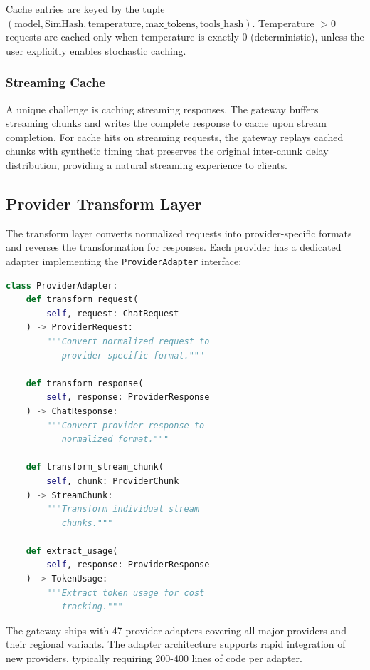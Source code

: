 Cache entries are keyed by the tuple $(\text{model}, \text{SimHash}, \text{temperature}, \text{max\_tokens}, \text{tools\_hash})$. Temperature $> 0$ requests are cached only when temperature is exactly 0 (deterministic), unless the user explicitly enables stochastic caching.

\subsubsection{Streaming Cache}

A unique challenge is caching streaming responses. The gateway buffers streaming chunks and writes the complete response to cache upon stream completion. For cache hits on streaming requests, the gateway replays cached chunks with synthetic timing that preserves the original inter-chunk delay distribution, providing a natural streaming experience to clients.

\subsection{Provider Transform Layer}

The transform layer converts normalized requests into provider-specific formats and reverses the transformation for responses. Each provider has a dedicated adapter implementing the \texttt{ProviderAdapter} interface:

\begin{lstlisting}[language=Python, caption=Provider adapter interface]
class ProviderAdapter:
    def transform_request(
        self, request: ChatRequest
    ) -> ProviderRequest:
        """Convert normalized request to
           provider-specific format."""

    def transform_response(
        self, response: ProviderResponse
    ) -> ChatResponse:
        """Convert provider response to
           normalized format."""

    def transform_stream_chunk(
        self, chunk: ProviderChunk
    ) -> StreamChunk:
        """Transform individual stream
           chunks."""

    def extract_usage(
        self, response: ProviderResponse
    ) -> TokenUsage:
        """Extract token usage for cost
           tracking."""
\end{lstlisting}

The gateway ships with 47 provider adapters covering all major providers and their regional variants. The adapter architecture supports rapid integration of new providers, typically requiring 200-400 lines of code per adapter.

